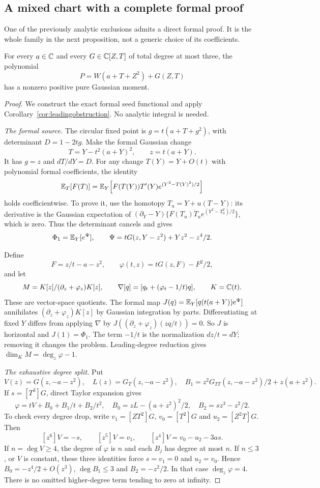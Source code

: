 \subsection{A mixed chart with a complete formal proof}\label{sec:mixedformal}

One of the previously analytic exclusions admits a direct formal proof.
It is the whole family in the next proposition, not a generic choice
of its coefficients.

\begin{proposition}\label{prop:mixedformal}
For every $a\in\mathbb C$ and every $G\in\mathbb C[Z,T]$ of total degree at most
three, the polynomial
\[
 P=W(a+T+Z^2)+G(Z,T)
\]
has a nonzero positive pure Gaussian moment.
\end{proposition}
\begin{proof}
We construct the exact formal seed functional and apply
Corollary~\ref{cor:leadingobstruction}. No analytic integral is needed.

\emph{The formal source.}
The circular fixed point is $g=t(a+T+g^2)$, with determinant
$D=1-2tg$. Make the formal Gaussian change
\[
 T=Y-t^2(a+Y)^2,\qquad z=t(a+Y).
\]
It has $g=z$ and $dT/dY=D$. For any change $T(Y)=Y+O(t)$ with
polynomial formal coefficients, the identity
\[
 \mathbb E_T[F(T)]=\mathbb E_Y\!\left[F(T(Y))T'(Y)
             e^{(Y^2-T(Y)^2)/2}\right]
\]
holds coefficientwise. To prove it, use the homotopy
$T_u=Y+u(T-Y)$: its derivative is the Gaussian expectation of
$(\partial_Y-Y)\{F(T_u)\dot T_u e^{(Y^2-T_u^2)/2}\}$, which is zero.
Thus the determinant cancels and gives
\[
 \Phi_1=\mathbb E_Y[e^\Psi],\qquad
 \Psi=tG(z,Y-z^2)+Yz^2-z^4/2.
\]

Define
\[
 F=z/t-a-z^2,\qquad \varphi(t,z)=tG(z,F)-F^2/2,
\]
and let
\[
 M=K[z]/(\partial_z+\varphi_z)K[z],\qquad
 \nabla[q]=[q_t+(\varphi_t-1/t)q],\qquad K=\mathbb C(t).
\]
These are vector-space quotients. The formal map
$J(q)=\mathbb E_Y[q(t(a+Y))e^\Psi]$ annihilates
$(\partial_z+\varphi_z)K[z]$ by Gaussian integration by parts.
Differentiating at fixed $Y$ differs from applying $\nabla$ by
$J((\partial_z+\varphi_z)(zq/t))=0$.
So $J$ is horizontal and $J(1)=\Phi_1$. The term $-1/t$ is the
normalization $dz/t=dY$; removing it changes the problem.
Leading-degree reduction gives $\dim_K M=\deg_z\varphi-1$.

\emph{The exhaustive degree split.}
Put
\[
 V(z)=G(z,-a-z^2),\quad L(z)=G_T(z,-a-z^2),\quad
 B_1=z^2G_{TT}(z,-a-z^2)/2+z(a+z^2).
\]
If $s=[T^3]G$, direct Taylor expansion gives
\begin{equation}\label{eq:mixedphi}
 \varphi=tV+B_0+B_1/t+B_2/t^2,
 \quad B_0=zL-(a+z^2)^2/2,\quad B_2=sz^3-z^2/2.
\end{equation}
To check every degree drop, write $v_1=[ZT^2]G$,
$v_0=[T^2]G$ and $u_2=[Z^2T]G$. Then
\[
 [z^6]V=-s,\qquad [z^5]V=v_1,\qquad
 [z^4]V=v_0-u_2-3as.
\]
If $n=\deg V\geq4$, the degree of $\varphi$ is $n$ and each $B_j$
has degree at most $n$. If $n\leq3$, or $V$ is constant, these three
identities force $s=v_1=0$ and $u_2=v_0$. Hence
$B_0=-z^4/2+O(z^3)$, $\deg B_1\leq3$ and $B_2=-z^2/2$.
In that case $\deg_z\varphi=4$. There is no omitted higher-degree
term tending to zero at infinity.


\end{proof}
